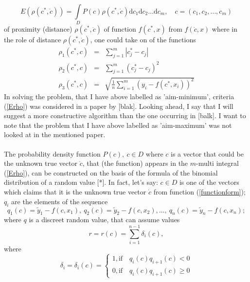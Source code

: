\documentclass[a4paper]{article}
\numberwithin{equation}{subsection}
\begin{document}
\begin{equation}
E(\rho(c^{*},\dot{c}))= \int\limits_{D}P(c)\rho(c^{*},\dot{c})\mathrm{d}c_{1}\mathrm{d}c_{2}\dots \mathrm{d}c_{m}, \quad c = (c_{1},c_{2},\dots,c_{m}) \label{Erho}
\end{equation}
of proximity (distance) $\rho(c^{*},\dot{c})$ of function $f(c^{*},x)$ from $f(\dot{c},x)$ where in the role of distance $\rho(c^{*},\dot{c})$, one could take on of the functions
\begin{eqnarray}
\rho_{1}(c^{*},c) &=& \sum\limits_{j=1}^{m} \left| c_{j}^{*}-c_{j} \right| \label{rho1}\\
\rho_{2}(c^{*},c) &=& \sum\limits_{j=1}^{m} \left( c_{j}^{*}-c_{j} \right)^{2} \label{rho2}\\
\rho_{3}(c^{*},c) &=& \sqrt{\frac{1}{n}\sum\limits_{i=1}^{m} \left( y_{i}-f(c^{*},x_{i}) \right)^{2}} \label{rho3}
\end{eqnarray}
In solving the problem, that I have above labelled as 'aim-minimum', criteria (\ref{Erho}) was considered in a paper by [blak]. Looking ahead, I say that I will suggest a more constructive algorithm than the one occurring in [balk]. I want to note that the problem that I have above labelled as 'aim-maximum' was not looked at in the mentioned paper. \\
\\
The probability density function $P(c),\  c \in D$ where $c$ is a vector that could be the unknown true vector $\dot{c}$, that (the function) appears in the $m$-multi integral (\ref{Erho}), can be constructed on the basis of the formula of the binomial distribution of a random value [*]. In fact, let's say: $c \in D$ is one of the vectors which claims that it is the unknown true vector $ \dot{c}$ from function (\ref{functionform}); $q_{i}$ are the elements of the sequence
\begin{equation}
q_{1}(c)=\tilde{y}_{1}-f(c,x_{1}),\ q_{2}(c)=\tilde{y}_{2}-f(c,x_{2}), \dots, \ q_{n}(c)=\tilde{y}_{n}-f(c,x_{n}); \label{sequence}
\end{equation}
where $q$ is a discreet random value, that can assume values
\begin{equation}
r=r(c)=\sum\limits_{i=1}^{n-1} \delta_{i}(c), \label{eq-values-of-q}
\end{equation}
where
\begin{equation}
\delta_{i}=\delta_{i}(c)=
\begin{cases} 
      1, \mathrm{if} \quad q_{i}(c)q_{i+1}(c)<0\\
      0, \mathrm{if} \quad q_{i}(c)q_{i+1}(c)\geq 0
   \end{cases}
\end{equation}
\end{document}
